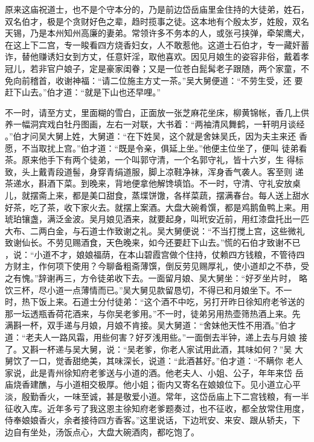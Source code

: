 原来这庙祝道士，也不是个守本分的，乃是前边岱岳庙里金住持的大徒弟，姓石，
双名伯才，极是个贪财好色之辈，趋时揽事之徒。这本地有个殷太岁，姓殷，双名
天锡，乃是本州知州高廉的妻弟。常领许多不务本的人，或张弓挟弹，牵架鹰犬，
在这上下二宫，专一睃看四方烧香妇女，人不敢惹他。这道士石伯才，专一藏奸蓄
诈，替他赚诱妇女到方丈，任意奸淫，取他喜欢。因见月娘生的姿容非俗，戴着孝
冠儿，若非官户娘子，定是豪家闺眷；又是一位苍白髭髯老子跟随，两个家童，不
免向前稽首，收谢神福：“请二位施主方丈一茶。”吴大舅便道：“不劳生受，还
要赶下山去。”伯才道：“就是下山也还早哩。”

不一时，请至方丈，里面糊的雪白，正面放一张芝麻花坐床，柳黄锦帐，香几上供
养一幅洞宾戏白牡丹图画，左右一对联，大书着：“两袖清风舞鹤，一轩明月谈经
。”伯才问吴大舅上姓，大舅道：“在下姓吴，这个就是舍妹吴氏，因为夫主来还
香愿，不当取扰上宫。”伯才道：“既是令亲，俱延上坐。”他便主位坐了，便叫
徒弟看茶。原来他手下有两个徒弟，一个叫郭守清，一个名郭守礼，皆十六岁，生
得标致，头上戴青段道髻，身穿青绢道服，脚上凉鞋净袜，浑身香气袭人。客至则
递茶递水，斟酒下菜。到晚来，背地便拿他解馋填馅。不一时，守清、守礼安放桌
儿，就摆斋上来，都是美口甜食，蒸堞饼馓，各样菜蔬，摆满春台。每人送上甜水
好茶，吃了茶，收下家火去。就摆上案酒。大盘大碗肴馔，都是鸡鹅鱼鸭上来。用
琥珀镶盏，满泛金波。吴月娘见酒来，就要起身，叫玳安近前，用红漆盘托出一匹
大布、二两白金，与石道士作致谢之礼。吴大舅便说：“不当打搅上宫，这些微礼
致谢仙长。不劳见赐酒食，天色晚来，如今还要赶下山去。”慌的石伯才致谢不已
，说：“小道不才，娘娘福荫，在本山碧霞宫做个住持，仗赖四方钱粮，不管待四
方财主，作何项下使用？今聊备粗斋薄馔，倒反劳见赐厚礼，使小道却之不恭，受
之有愧。”辞谢再三，方令徒弟收下去。一面留月娘、吴大舅坐：“好歹坐片时，
略饮三杯，尽小道一点薄情而已。”吴大舅见款留恳切，不得已和月娘坐下。不一
时，热下饭上来。石道士分付徒弟：“这个酒不中吃，另打开昨日徐知府老爷送的
那一坛透瓶香荷花酒来，与你吴老爹用。”不一时，徒弟另用热壶筛热酒上来。先
满斟一杯，双手递与月娘，月娘不肯接。吴大舅道：“舍妹他天性不用酒。”伯才
道：“老夫人一路风霜，用些何害？好歹浅用些。”一面倒去半钟，递上去与月娘
接了。又斟一杯递与吴大舅，说：“吴老爹，你老人家试用此酒，其味如何？”吴
大舅饮了一口，觉香甜绝美，其味深长，说道：“此酒甚好。”伯才道：“不瞒你
老人家说，此是青州徐知府老爹送与小道的酒。他老夫人、小姐、公子，年年来岱
岳庙烧香建醮，与小道相交极厚。他小姐；衙内又寄名在娘娘位下。见小道立心平
淡，殷勤香火，一味至诚，甚是敬爱小道。常年，这岱岳庙上下二宫钱粮，有一半
征收入库。近年多亏了我这恩主徐知府老爹题奏过，也不征收，都全放常住用度，
侍奉娘娘香火，余者接待四方香客。”这里说话，下边玳安、来安、跟从轿夫，下
边自有坐处，汤饭点心，大盘大碗酒肉，都吃饱了。

